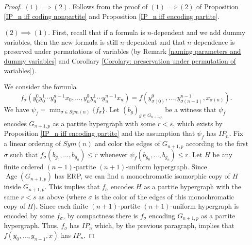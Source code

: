 \documentclass{amsart}
\newtheorem{external claim}[teor]{Claim}
\DeclareMathOperator{\age}{{Age}}
\begin{document}
\begin{proof}
        $(1)\implies (2)$. Follows from the proof of $(1)\implies (2)$ of Proposition \ref{IP_n iff coding nonpartite} and Proposition \ref{IP_n iff encoding partite}.
        
        $(2)\implies (1)$. First, recall that if a formula is $n$-dependent and we add dummy variables, then the new formula is still $n$-dependent and that $n$-dependence is preserved under permutations of variables (by Remark \ref{naming parameters and dummy variables} and Corollary \ref{Corolary: preservation under permutation of variables}). 
    
    We consider the formula $$f_\sigma(y^0_0y^1_0\cdots y^{n-1}_0x_0,\dots,y^0_ny^1_n\cdots y^{n-1}_nx_n)=f(y^0_{\sigma(0)},\dots ,y^{n-1}_{\sigma({n-1})},x_{\sigma(n)}).$$We have $\psi_f=\min_{\sigma\in Sym(n)} \{f_\sigma\}$.
    Let $(b_g)_{g\in G_{n+1,p}}$ be a witness that $\psi_f$ encodes $G_{n+1,p}$ as a partite hypergraph with some $r<s$, which exists by Proposition \ref{IP_n iff encoding partite} and the assumption that $\psi_f$ has $IP_n$. Fix a linear ordering of $Sym(n)$ and color the edges of $G_{n+1,p}$ according to the first $\sigma$ such that $f_\sigma(b_{g_0},\dots,b_{g_n})\leq r$ whenever $\psi_f(b_{g_0},\dots,b_{g_n})\leq r$. Let $H$ be any finite ordered $(n+1)$-partite $(n+1)$-uniform hypergraph. Since $\age(G_{n+1,p})$ has ERP, we can find a monochromatic isomorphic copy of $H$ inside $G_{n+1,p}$. This implies that $f_\sigma$ encodes $H$ as a partite hypergraph with the same $r<s$ as above (where $\sigma$ is the color of the edges of this monochromatic copy of $H$). Since each finite $(n+1)$-partite $(n+1)$-uniform hypergraph is encoded by some $f_\sigma$, by compactness there is $f_\sigma$ encoding $G_{n+1,p}$ as a partite hypergraph. Thus, $f_\sigma$ has $IP_n$ which, by the previous paragraph, implies that $f(y_0,\dots,y_{n-1},x)$ has $IP_n$.
\end{proof}
\end{document}
